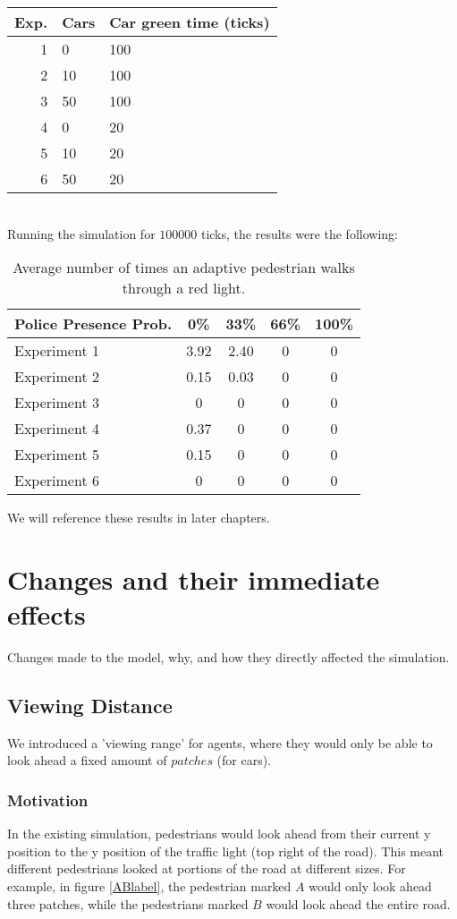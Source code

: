\documentclass[a4paper]{article}
\begin{document}
\begin{tabular}{ r | l | l }
  Exp. & Cars & Car green time (ticks) \\
  \hline
  1 &  0 & 100 \\
  2 & 10 & 100 \\
  3 & 50 & 100 \\
  4 &  0 & 20  \\
  5 & 10 & 20  \\
  6 & 50 & 20  \\
\end{tabular}\\

Running the simulation for $100 000$ ticks, the results were the following:
\begin{table}[H]
\centering
\begin{tabular}{ l | c c c c }
  Police Presence Prob. & 0\% & 33\% & 66\% & 100\% \\ 
  \hline
  Experiment 1 & 3.92 & 2.40 & 0 & 0  \\
  Experiment 2 & 0.15 & 0.03 & 0 & 0  \\
  Experiment 3 & 0    & 0    & 0 & 0  \\
  Experiment 4 & 0.37 & 0    & 0 & 0  \\
  Experiment 5 & 0.15 & 0    & 0 & 0  \\
  Experiment 6 & 0    & 0    & 0 & 0  \\
\end{tabular}
\caption{Average number of times an adaptive 
pedestrian walks through a red light.}
\end{table}

We will reference these results in later chapters.

\clearpage

\section{Changes and their immediate effects}
Changes made to the model, why, and how they directly  affected the simulation.

\subsection{Viewing Distance}
We introduced a 'viewing range' for agents, where they would only be able to look ahead a fixed amount of $patches$ (for cars).

\subsubsection{Motivation}
In the existing simulation, pedestrians would look ahead from their current y position to the y position of the traffic light (top right of the road). This meant different pedestrians looked at portions of the road at different sizes. For example, in figure \ref{ABlabel}, the pedestrian marked $A$ would only look ahead three patches, while the pedestrians marked $B$ would look ahead the entire road.
\end{document}
